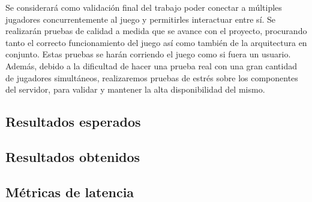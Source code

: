 
\noindent Se considerará como validación final del trabajo poder conectar a múltiples jugadores 
concurrentemente al juego y permitirles interactuar entre sí. Se realizarán pruebas de 
calidad a medida que se avance con el proyecto, procurando tanto el correcto funcionamiento 
del juego así como también de la arquitectura en conjunto. Estas pruebas se harán corriendo 
el juego como si fuera un usuario. Además, debido a la dificultad de hacer una prueba real 
con una gran cantidad de jugadores simultáneos, realizaremos pruebas de estrés sobre los 
componentes del servidor, para validar y mantener la alta disponibilidad del mismo.

\subsection{Resultados esperados}

\subsection{Resultados obtenidos}

\subsection{Métricas de latencia}